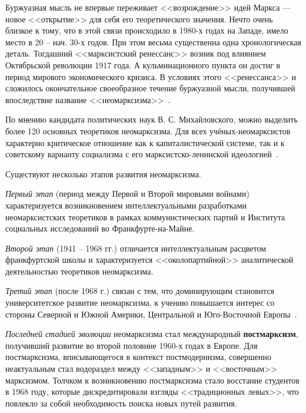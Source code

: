 Буржуазная мысль не впервые переживает <<возрождение>> идей Маркса ---
новое <<открытие>> для себя его теоретического значения. Нечто очень близкое к тому,
что в этой связи происходило в 1980-х годах на Западе, имело место в 20 -- нач. 30-х годов.
При этом весьма существенна одна хронологическая деталь. Тогдашний <<марксистский
ренессанс>> возник под влиянием Октябрьской революции 1917 года. А кульминационного
пункта он достиг в период мирового экономического кризиса. В условиях этого
<<ренессанса>> и сложилось окончательное своеобразное течение буржуазной мысли,
получившей впоследствие название <<неомарксизма>>~\cite{neomarxism}.

По мнению кандидата политических наук В. С. Михайловского, можно выделить более 120
основных теоретиков неомарксизма. Для всех учёных-неомарксистов характерно
критическое отношение как к капиталистической системе, так и к советскому
варианту социализма с его марксистско-ленинской идеологией~\cite{stepin1999}.

Существуют несколько этапов развития неомарксизма.

\textit{Первый этап} (период между Первой и Второй мировыми войнами) характеризуется
возникновением интеллектуальными разработками неомарксистских теоретиков
в рамках коммунистических партий и Института социальных исследований
во Франкфурте-на-Майне.

\textit{Второй этап} (1941 -- 1968 гг.) отличается интеллектуальным расцветом
франкфуртской школы и характеризуется <<околопартийной>> аналитической
деятельностью теоретиков неомарксизма.

\textit{Третий этап} (после 1968 г.) связан с тем, что доминирующим становится
университетское развитие неомарксизма, к учению повышается интерес со стороны
Северной и Южной Америки, Центральной и Юго-Восточной Европы~\cite{article_neomarxism_today_and_tomorrow}.

\textit{Последней стадией эволюции} неомарксизма стал международный \textbf{постмарксизм},
получивший развитие во второй половине 1960-х годах в Европе. Для постмарксизма,
вписывающегося в контекст постмодернизма, совершенно неактуальным
стал водораздел между <<западным>> и <<восточным>> марксизмом.
Толчком к возникновению постмарксизма стало восстание студентов в 1968 году,
которые дискредитировали взгляды <<традиционных левых>>, что повлекло за собой
необходимость поиска новых путей развития.


